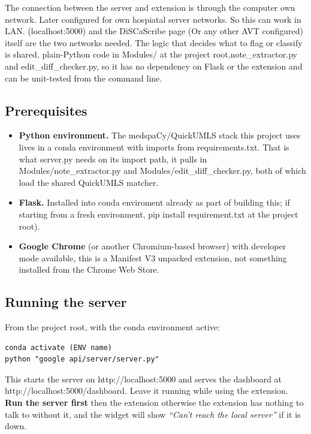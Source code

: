 \documentclass[11pt,a4paper]{article}
\begin{document}
The connection between the server and extension is through the computer own network. Later configured for own hospiatal server networks. So this can work in LAN.
(localhost:5000) and the DiSCaScribe page (Or any other AVT configured) itself are the two networks needed. The logic that decides what to flag or classify is shared, plain-Python code in
Modules/ at the project root,note\_extractor.py and
edit\_diff\_checker.py, so it has no dependency on Flask or the
extension and can be unit-tested from the command line.

\subsection{Prerequisites}
\label{sec:prereqs}

\begin{itemize}
  \item \textbf{Python environment.} The medspaCy/QuickUMLS stack this
  project uses lives in a conda environment with imports from requirements.txt. That is
  what server.py needs on its import path, it pulls in
  Modules/note\_extractor.py and Modules/edit\_diff\_checker.py,
  both of which load the shared QuickUMLS matcher.
  \item \textbf{Flask.} Installed into conda enviroment already as part
  of building this; if starting from a fresh environment, pip install
  requirement.txt at the project root).
  \item \textbf{Google Chrome} (or another Chromium-based browser) with
  developer mode available, this is a Manifest V3 unpacked extension, not
  something installed from the Chrome Web Store.
\end{itemize}



\subsection{Running the server}

From the project root, with the conda environment active:

\begin{verbatim}
conda activate (ENV name)
python "google api/server/server.py"
\end{verbatim}

This starts the server on http://localhost:5000 and serves the
dashboard at http://localhost:5000/dashboard. Leave it running while
using the extension.
\textbf{Run the server first} then the extension otherwise the extension has nothing to talk to without it, and the widget will show \emph{``Can't reach the local server''} if it is down.
\end{document}
